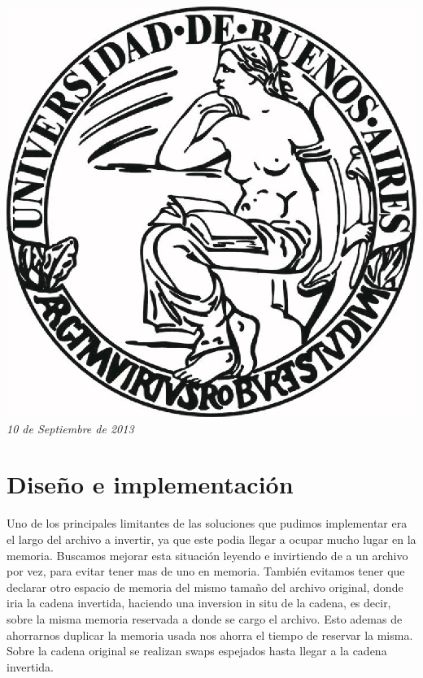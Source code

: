 \documentclass{article}
\begin{document}
\begin{titlepage}
\includegraphics[scale=0.5]{UBA.jpg}\\[1cm] %


{\large \text \em {10 de Septiembre de 2013}}\\[3cm] %
 

\vfill %

\end{titlepage}

	\tableofcontents
		
\newpage

\section{Diseño e implementación}

Uno de los principales limitantes de las soluciones que pudimos implementar era el largo del archivo a invertir, ya que este podia llegar a ocupar mucho lugar en la memoria. Buscamos mejorar esta situación leyendo e invirtiendo de a un archivo por vez, para evitar tener mas de uno en memoria. También evitamos tener que declarar otro espacio de memoria del mismo tamaño del archivo original, donde iria la cadena invertida, haciendo una inversion in situ de la cadena, es decir, sobre la misma memoria reservada a donde se cargo el archivo. Esto ademas de ahorrarnos duplicar la memoria usada nos ahorra el tiempo de reservar la misma. Sobre la cadena original se realizan swaps espejados hasta llegar a la cadena invertida.
\end{document}
